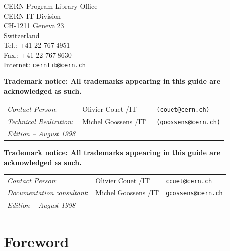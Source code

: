 \vspace{6mm}
\begin{htmlonly}
\begin{flushleft}
CERN Program Library Office              \\
CERN-IT Division                         \\
CH-1211 Geneva 23                        \\
Switzerland                              \\
Tel.: +41 22 767 4951                    \\
Fax.: +41 22 767 8630                    \\
Internet: \texttt{cernlib@cern.ch}                
\end{flushleft}
\end{htmlonly}
 
{\bf Trademark notice: All trademarks appearing in this guide are acknowledged as such.}
\vfill
\begin{tabular}{l@{\quad}l@{\quad}>{\tt}l}
{\em Contact Person\/}:        & Olivier Couet /IT   & (couet@cern.ch)\\[1mm]
{\em Technical Realization\/}: & Michel Goossens /IT & (goossens@cern.ch)\\[1cm]
{\em Edition -- August 1998}
\end{tabular}
\begin{htmlonly}
{\bf Trademark notice: All trademarks appearing in this guide are acknowledged as such.}

\begin{tabular}{lll}
\emph{Contact Person}:           & Olivier Couet /IT   & \texttt{couet@cern.ch}\\
\emph{Documentation consultant}: & Michel Goossens /IT & \texttt{goossens@cern.ch}\\
\emph{Edition -- August 1998}
\end{tabular}
\end{htmlonly}
\newpage
 
\setcounter{page}{1}

\chapter*{Foreword}

